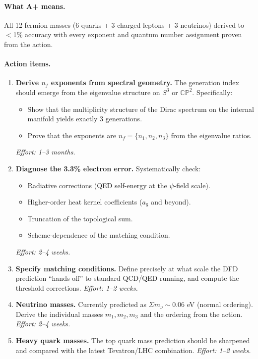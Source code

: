 \documentclass[11pt,a4paper]{article}
\begin{document}
\paragraph{What A+ means.}
All 12 fermion masses (6 quarks + 3 charged leptons + 3 neutrinos) derived to $<$1\% accuracy with every exponent and quantum number assignment proven from the action.

\paragraph{Action items.}
\begin{enumerate}
    \item \textbf{Derive $n_f$ exponents from spectral geometry.} The generation index should emerge from the eigenvalue structure on $S^3$ or $\mathbb{CP}^2$. Specifically:
    \begin{itemize}
        \item Show that the multiplicity structure of the Dirac spectrum on the internal manifold yields exactly 3 generations.
        \item Prove that the exponents are $n_f = \{n_1, n_2, n_3\}$ from the eigenvalue ratios.
    \end{itemize}
    \emph{Effort: 1--3 months.}
    \item \textbf{Diagnose the 3.3\% electron error.} Systematically check:
    \begin{itemize}
        \item Radiative corrections (QED self-energy at the $\psi$-field scale).
        \item Higher-order heat kernel coefficients ($a_6$ and beyond).
        \item Truncation of the topological sum.
        \item Scheme-dependence of the matching condition.
    \end{itemize}
    \emph{Effort: 2--4 weeks.}
    \item \textbf{Specify matching conditions.} Define precisely at what scale the DFD prediction ``hands off'' to standard QCD/QED running, and compute the threshold corrections. \emph{Effort: 1--2 weeks.}
    \item \textbf{Neutrino masses.} Currently predicted as $\Sigma m_\nu \sim 0.06$ eV (normal ordering). Derive the individual masses $m_1, m_2, m_3$ and the ordering from the action. \emph{Effort: 2--4 weeks.}
    \item \textbf{Heavy quark masses.} The top quark mass prediction should be sharpened and compared with the latest Tevatron/LHC combination. \emph{Effort: 1--2 weeks.}
\end{enumerate}
\end{document}
